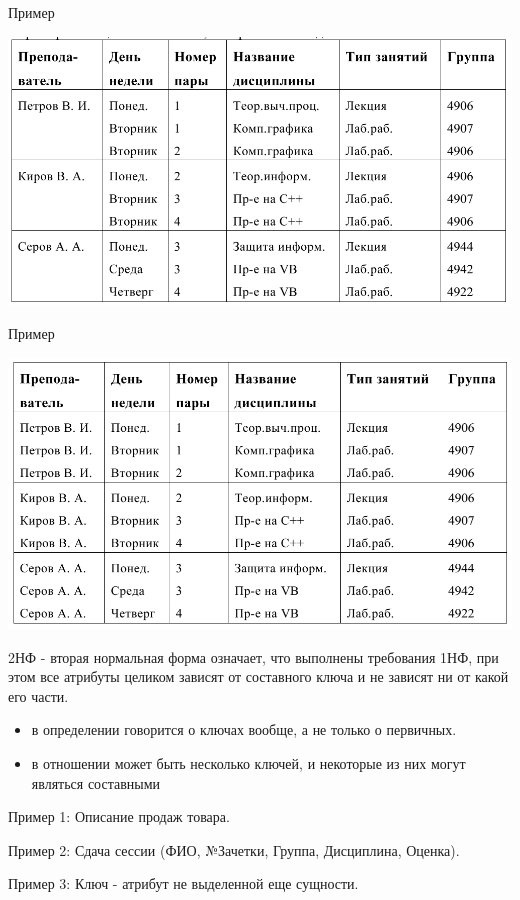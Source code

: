 \documentclass{beamer}
\begin{document}
\begin{frame}
\begin{block}{Пример}
\begin{center}
\includegraphics[scale=0.4]{images/nf-0.png}
\end{center}
\end{block}
\end{frame}

\begin{frame}
\begin{block}{Пример}
\begin{center}
\includegraphics[scale=0.4]{images/nf-1.png}
\end{center}
\end{block}
\end{frame}

\begin{frame}
\begin{block}{2НФ - вторая нормальная форма}
означает, что выполнены требования 1НФ, при этом все атрибуты целиком зависят от составного ключа и не
зависят ни от какой его части.
\end{block}
\begin{itemize}
\item в определении говорится о ключах вообще, а не только о первичных. 
\item в отношении может быть несколько ключей, и некоторые из них могут являться составными
\end{itemize}
Пример 1: Описание продаж товара.

Пример 2: Сдача сессии (ФИО, №Зачетки, Группа, Дисциплина, Оценка).

Пример 3: Ключ - атрибут не выделенной еще сущности.
\end{frame}
\end{document}

